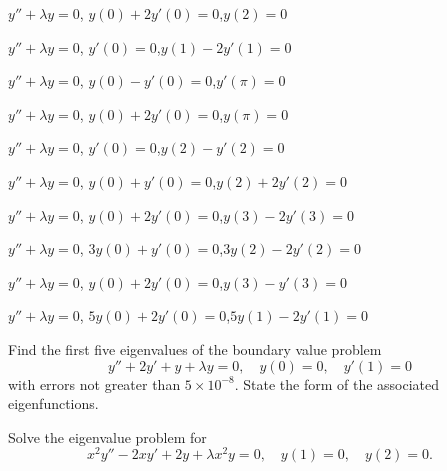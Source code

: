 \begin{exerciselist}
 \item\label{exer:13.2.11}\Cex
$y''+\lambda y=0$, \quad  $y(0)+2y'(0)=0$,\quad $y(2)=0$

 \item\label{exer:13.2.12}\Cex
$y''+\lambda y=0$, \quad  $y'(0)=0$,\quad $y(1)-2y'(1)=0$


\item\label{exer:13.2.13}\Cex
$y''+\lambda y=0$, \quad  $y(0)-y'(0)=0$,\quad $y'(\pi)=0$


 \item\label{exer:13.2.14}\Cex
$y''+\lambda y=0$, \quad  $y(0)+2y'(0)=0$,\quad $y(\pi)=0$


\item\label{exer:13.2.15}\Cex
$y''+\lambda y=0$, \quad  $y'(0)=0$,\quad $y(2)-y'(2)=0$



 \item\label{exer:13.2.16}\Cex
$y''+\lambda y=0$, \quad  $y(0)+y'(0)=0$,\quad $y(2)+2y'(2)=0$


 \item\label{exer:13.2.17}\Cex
$y''+\lambda y=0$, \quad  $y(0)+2y'(0)=0$,\quad $y(3)-2y'(3)=0$



 \item\label{exer:13.2.18}\Cex
$y''+\lambda y=0$, \quad  $3y(0)+y'(0)=0$,\quad $3y(2)-2y'(2)=0$




 \item\label{exer:13.2.19}\Cex
$y''+\lambda y=0$, \quad  $y(0)+2y'(0)=0$,\quad $y(3)-y'(3)=0$


 \item\label{exer:13.2.20}\Cex
$y''+\lambda y=0$, \quad  $5y(0)+2y'(0)=0$,\quad $5y(1)-2y'(1)=0$




\item\label{exer:13.2.21}Find the first five eigenvalues of  the boundary value problem
\[
y''+2y'+y+\lambda y=0,\quad y(0)=0,\quad y'(1)=0
\]
with errors not greater than $5\times 10^{-8}$. State the form of the
associated eigenfunctions.





\item\label{exer:13.2.22}Solve the eigenvalue problem  for
\[
x^{2}y''-2xy'+2y+\lambda x^{2}y=0, \quad y(1)=0,\quad y(2)=0.
\]




\end{exerciselist}
